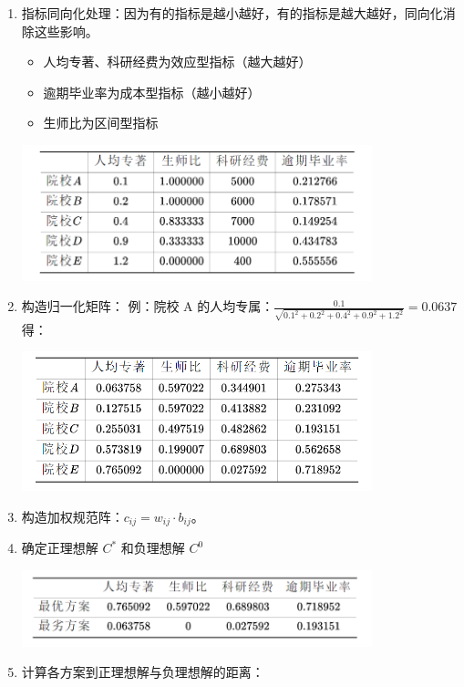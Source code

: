 \documentclass[12pt,a4paper]{article}
\begin{document}
\begin{enumerate}
  \item 指标同向化处理：因为有的指标是越小越好，有的指标是越大越好，同向化消除这些影响。
  \begin{itemize}
    \item 人均专著、科研经费为效应型指标（越大越好）
    \item 逾期毕业率为成本型指标（越小越好）
    \item 生师比为区间型指标
  \end{itemize}
  \begin{center}
    \includegraphics[width = 0.8\textwidth]{figures/topsis_samedir.png}
  \end{center}
  \item 构造归一化矩阵：
  例：院校 A 的人均专属：$\frac{0.1}{\sqrt{0.1^2+0.2^2+0.4^2+0.9^2+1.2^2}} = 0.0637$
  得：
  \begin{center}
    \includegraphics[width = 0.8\textwidth]{figures/topsis_normalization.png}
  \end{center}
  \item 构造加权规范阵：$c_{ij} = w_{ij}\cdot b_{ij}$。
  \item 确定正理想解 $C^*$ 和负理想解 $C^0$
  \begin{center}
    \includegraphics[width = 0.8\textwidth]{figures/topsis_idealsol.png}
  \end{center}
  \item 计算各方案到正理想解与负理想解的距离：

\end{enumerate}
\end{document}
